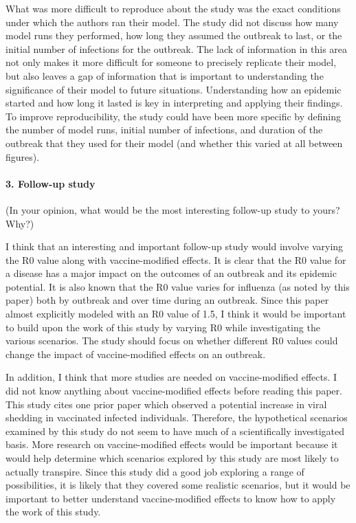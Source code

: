 \documentclass[]{article}
\let\oldparagraph\paragraph
\renewcommand{\paragraph}[1]{\oldparagraph{#1}\mbox{}}
\begin{document}
What was more difficult to reproduce about the study was the exact
conditions under which the authors ran their model. The study did not
discuss how many model runs they performed, how long they assumed the
outbreak to last, or the initial number of infections for the outbreak.
The lack of information in this area not only makes it more difficult
for someone to precisely replicate their model, but also leaves a gap of
information that is important to understanding the significance of their
model to future situations. Understanding how an epidemic started and
how long it lasted is key in interpreting and applying their findings.
To improve reproducibility, the study could have been more specific by
defining the number of model runs, initial number of infections, and
duration of the outbreak that they used for their model (and whether
this varied at all between figures).

\hypertarget{follow-up-study}{%
\paragraph{3. Follow-up study}\label{follow-up-study}}

(In your opinion, what would be the most interesting follow-up study to
yours? Why?)

I think that an interesting and important follow-up study would involve
varying the R0 value along with vaccine-modified effects. It is clear
that the R0 value for a disease has a major impact on the outcomes of an
outbreak and its epidemic potential. It is also known that the R0 value
varies for influenza (as noted by this paper) both by outbreak and over
time during an outbreak. Since this paper almost explicitly modeled with
an R0 value of 1.5, I think it would be important to build upon the work
of this study by varying R0 while investigating the various scenarios.
The study should focus on whether different R0 values could change the
impact of vaccine-modified effects on an outbreak.

In addition, I think that more studies are needed on vaccine-modified
effects. I did not know anything about vaccine-modified effects before
reading this paper. This study cites one prior paper which observed a
potential increase in viral shedding in vaccinated infected individuals.
Therefore, the hypothetical scenarios examined by this study do not seem
to have much of a scientifically investigated basis. More research on
vaccine-modified effects would be important because it would help
determine which scenarios explored by this study are most likely to
actually transpire. Since this study did a good job exploring a range of
possibilities, it is likely that they covered some realistic scenarios,
but it would be important to better understand vaccine-modified effects
to know how to apply the work of this study.
\end{document}
